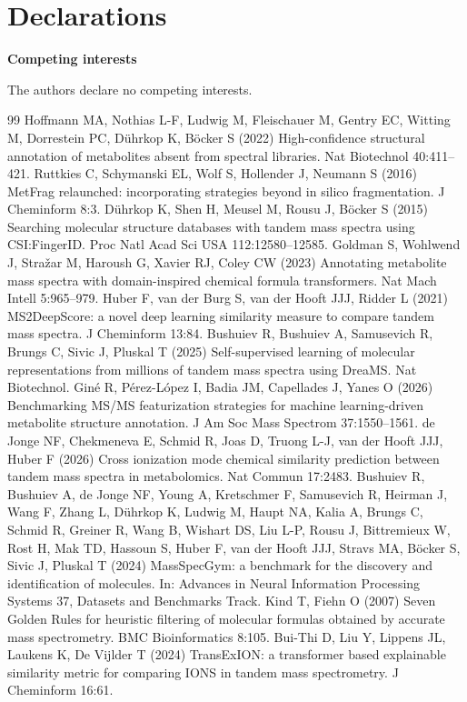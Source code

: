 \documentclass[11pt]{article}
\newcommand{\hd}[1]{\medskip\par\noindent\textbf{#1}\par\nobreak\vspace{2pt}\noindent\ignorespaces}
\begin{document}
\fussy
\section*{Declarations}
\hd{Competing interests} The authors declare no competing interests.

\begin{thebibliography}{99}
\small
{} Hoffmann MA, Nothias L-F, Ludwig M, Fleischauer M, Gentry EC, Witting M, Dorrestein PC, D\"uhrkop K, B\"ocker S (2022) High-confidence structural annotation of metabolites absent from spectral libraries. Nat Biotechnol 40:411--421.
 Ruttkies C, Schymanski EL, Wolf S, Hollender J, Neumann S (2016) MetFrag relaunched: incorporating strategies beyond in silico fragmentation. J Cheminform 8:3.
 D\"uhrkop K, Shen H, Meusel M, Rousu J, B\"ocker S (2015) Searching molecular structure databases with tandem mass spectra using CSI:FingerID. Proc Natl Acad Sci USA 112:12580--12585.
 Goldman S, Wohlwend J, Stra\v{z}ar M, Haroush G, Xavier RJ, Coley CW (2023) Annotating metabolite mass spectra with domain-inspired chemical formula transformers. Nat Mach Intell 5:965--979.
 Huber F, van der Burg S, van der Hooft JJJ, Ridder L (2021) MS2DeepScore: a novel deep learning similarity measure to compare tandem mass spectra. J Cheminform 13:84.
 Bushuiev R, Bushuiev A, Samusevich R, Brungs C, Sivic J, Pluskal T (2025) Self-supervised learning of molecular representations from millions of tandem mass spectra using DreaMS. Nat Biotechnol.
 Gin\'e R, P\'erez-L\'opez I, Badia JM, Capellades J, Yanes O (2026) Benchmarking MS/MS featurization strategies for machine learning-driven metabolite structure annotation. J Am Soc Mass Spectrom 37:1550--1561.
 de Jonge NF, Chekmeneva E, Schmid R, Joas D, Truong L-J, van der Hooft JJJ, Huber F (2026) Cross ionization mode chemical similarity prediction between tandem mass spectra in metabolomics. Nat Commun 17:2483.
 Bushuiev R, Bushuiev A, de Jonge NF, Young A, Kretschmer F, Samusevich R, Heirman J, Wang F, Zhang L, D\"uhrkop K, Ludwig M, Haupt NA, Kalia A, Brungs C, Schmid R, Greiner R, Wang B, Wishart DS, Liu L-P, Rousu J, Bittremieux W, Rost H, Mak TD, Hassoun S, Huber F, van der Hooft JJJ, Stravs MA, B\"ocker S, Sivic J, Pluskal T (2024) MassSpecGym: a benchmark for the discovery and identification of molecules. In: Advances in Neural Information Processing Systems 37, Datasets and Benchmarks Track.
 Kind T, Fiehn O (2007) Seven Golden Rules for heuristic filtering of molecular formulas obtained by accurate mass spectrometry. BMC Bioinformatics 8:105.
 Bui-Thi D, Liu Y, Lippens JL, Laukens K, De Vijlder T (2024) TransExION: a transformer based explainable similarity metric for comparing IONS in tandem mass spectrometry. J Cheminform 16:61.
\end{thebibliography}
\end{document}
